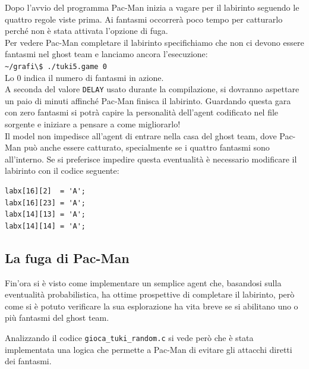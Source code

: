 \documentclass[8pt]{book}
\begin{document}
Dopo l'avvio del programma Pac-Man inizia a vagare per il labirinto seguendo le quattro regole viste prima. Ai fantasmi occorrerà poco tempo per catturarlo perché non è stata attivata l'opzione di fuga.\\
Per vedere Pac-Man completare il labirinto specifichiamo che non ci devono essere fantasmi nel ghost team e lanciamo ancora l'esecuzione:\\
\newline
\texttt{\textasciitilde{}/grafi\textbackslash{}\$ ./tuki5.game 0}\\

Lo 0 indica il numero di fantasmi in azione.\\
A seconda del valore \texttt{DELAY} usato durante la compilazione, si dovranno aspettare un paio di minuti affinché Pac-Man finisca il labirinto. Guardando questa gara con zero fantasmi si potrà capire la personalità dell'agent codificato nel file sorgente e iniziare a pensare a come migliorarlo!\\
Il model non impedisce all'agent di entrare nella casa del ghost team, dove Pac-Man può anche essere catturato, specialmente se i quattro fantasmi sono all'interno. Se si preferisce impedire questa eventualità è necessario modificare il labirinto con il codice seguente:

  \begin{spacing}{0.9}
    \begin{small}
      \begin{tcolorbox}
\begin{verbatim}
labx[16][2]  = 'A';
labx[16][23] = 'A';
labx[14][13] = 'A';
labx[14][14] = 'A';
\end{verbatim}
\end{tcolorbox}
    \end{small}
  \end{spacing}


\subsection{La fuga di Pac-Man}

Fin'ora si è visto come implementare un semplice agent che, basandosi sulla eventualità probabilistica, ha ottime prospettive di completare il labirinto, però come si è potuto verificare la sua esplorazione ha vita breve se si abilitano uno o più fantasmi del ghost team.

Analizzando il codice \texttt{gioca\_tuki\_random.c} si vede però che è stata implementata una logica che permette a Pac-Man di evitare gli attacchi diretti dei fantasmi.
\end{document}

